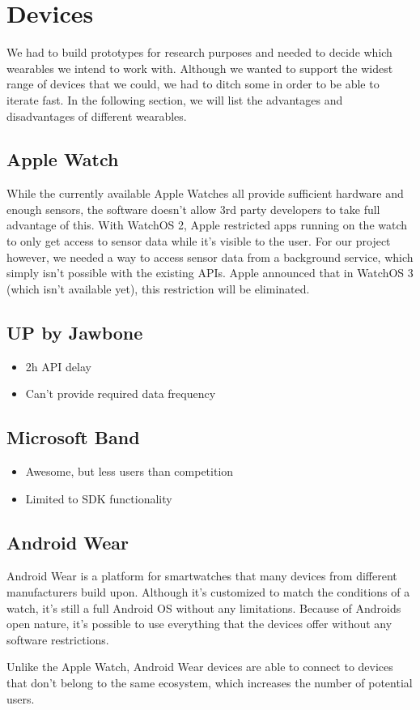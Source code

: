 \section{Devices}
\label{sec:devices}

We had to build prototypes for research purposes and needed to decide which wearables we intend to work with.
Although we wanted to support the widest range of devices that we could, we had to ditch some in order to be able to iterate fast.
In the following section, we will list the advantages and disadvantages of different wearables.

\subsection{Apple Watch}
While the currently available Apple Watches all provide sufficient hardware and enough sensors, the software doesn't allow 3rd party developers to take full advantage of this.
With WatchOS 2, Apple restricted apps running on the watch to only get access to sensor data while it's visible to the user.
For our project however, we needed a way to access sensor data from a background service, which simply isn't possible with the existing APIs.
Apple announced that in WatchOS 3 (which isn't available yet), this restriction will be eliminated. 

\subsection{UP by Jawbone}
\begin{itemize}[noitemsep]
	\item 2h API delay
	\item Can't provide required data frequency
\end{itemize}
\lipsum[1]

\subsection{Microsoft Band}
\begin{itemize}[noitemsep]
	\item Awesome, but less users than competition
	\item Limited to SDK functionality
\end{itemize}
\lipsum[1]

\subsection{Android Wear}
Android Wear is a platform for smartwatches that many devices from different manufacturers build upon.
Although it's customized to match the conditions of a watch, it's still a full Android OS without any limitations.
Because of Androids open nature, it's possible to use everything that the devices offer without any software restrictions.

Unlike the Apple Watch, Android Wear devices are able to connect to devices that don't belong to the same ecosystem, which increases the number of potential users.

\clearpage
